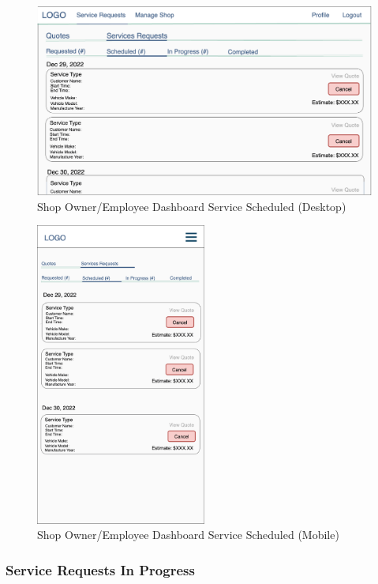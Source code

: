 \documentclass[12pt, titlepage]{article}
\begin{document}
\begin{figure}[H]
	\centering
	\includegraphics[width=\textwidth]{mockups/Shop Owner Dashboard (Service Requests - Scheduled) (Desktop).png}
	\caption{Shop Owner/Employee Dashboard \textemdash{} Service \textemdash{} Scheduled (Desktop)}
\end{figure}

\begin{figure}[H]
	\centering
	\includegraphics[width=0.5\textwidth]{mockups/Shop Owner Dashboard (Service Requests - Scheduled) (Mobile).png}
	\caption{Shop Owner/Employee Dashboard \textemdash{} Service \textemdash{} Scheduled (Mobile)}
\end{figure}

\subsubsection{Service Requests \textemdash{} In Progress}
\end{document}
